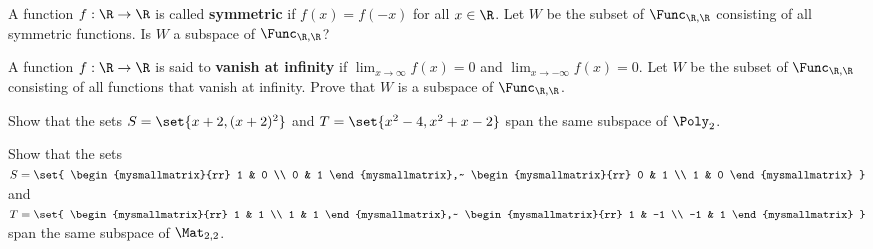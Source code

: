 \begin{ex}
  A function $f:\R\to\R$ is called \textbf{symmetric}%
   if $f(x)=f(-x)$ for all $x\in\R$.  Let
  $W$ be the subset of $\Func_{\R,\R}$ consisting of all symmetric
  functions. Is $W$ a subspace of $\Func_{\R,\R}$?
\end{ex}

\begin{ex}
  A function $f:\R\to\R$ is said to \textbf{vanish at infinity}%
   if $\lim_{x\to\infty}f(x)=0$ and
  $\lim_{x\to-\infty}f(x)=0$. Let $W$ be the subset of $\Func_{\R,\R}$
  consisting of all functions that vanish at infinity. Prove that $W$
  is a subspace of $\Func_{\R,\R}$.
\end{ex}

\begin{ex}
  Show that the sets $S=\set{x+2,(x+2)^2}$ and
  $T=\set{x^2-4, x^2+x-2}$ span the same subspace of $\Poly_2$.
\end{ex}

\begin{ex}
  Show that the sets $S=\set{
    \begin{mysmallmatrix}{rr} 1 & 0 \\ 0 & 1 \end{mysmallmatrix},~
    \begin{mysmallmatrix}{rr} 0 & 1 \\ 1 & 0 \end{mysmallmatrix}
  }$ and $T=\set{
    \begin{mysmallmatrix}{rr} 1 & 1 \\ 1 & 1 \end{mysmallmatrix},~
    \begin{mysmallmatrix}{rr} 1 & -1 \\ -1 & 1 \end{mysmallmatrix}
  }$
  span the same subspace of $\Mat_{2,2}$.
\end{ex}
